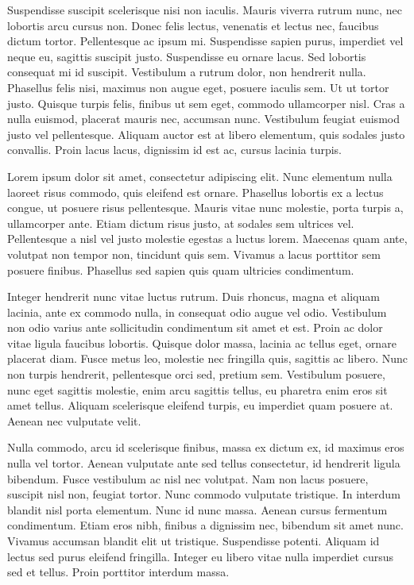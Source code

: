 \documentclass[twoside,openright,a4paper,11pt,french]{article}
\begin{document}
Suspendisse suscipit scelerisque nisi non iaculis. Mauris viverra rutrum nunc, nec lobortis arcu cursus non. Donec felis lectus, venenatis et lectus nec, faucibus dictum tortor. Pellentesque ac ipsum mi. Suspendisse sapien purus, imperdiet vel neque eu, sagittis suscipit justo. Suspendisse eu ornare lacus. Sed lobortis consequat mi id suscipit. Vestibulum a rutrum dolor, non hendrerit nulla. Phasellus felis nisi, maximus non augue eget, posuere iaculis sem. Ut ut tortor justo. Quisque turpis felis, finibus ut sem eget, commodo ullamcorper nisl. Cras a nulla euismod, placerat mauris nec, accumsan nunc. Vestibulum feugiat euismod justo vel pellentesque. Aliquam auctor est at libero elementum, quis sodales justo convallis. Proin lacus lacus, dignissim id est ac, cursus lacinia turpis.

Lorem ipsum dolor sit amet, consectetur adipiscing elit. Nunc elementum nulla laoreet risus commodo, quis eleifend est ornare. Phasellus lobortis ex a lectus congue, ut posuere risus pellentesque. Mauris vitae nunc molestie, porta turpis a, ullamcorper ante. Etiam dictum risus justo, at sodales sem ultrices vel. Pellentesque a nisl vel justo molestie egestas a luctus lorem. Maecenas quam ante, volutpat non tempor non, tincidunt quis sem. Vivamus a lacus porttitor sem posuere finibus. Phasellus sed sapien quis quam ultricies condimentum.

Integer hendrerit nunc vitae luctus rutrum. Duis rhoncus, magna et aliquam lacinia, ante ex commodo nulla, in consequat odio augue vel odio. Vestibulum non odio varius ante sollicitudin condimentum sit amet et est. Proin ac dolor vitae ligula faucibus lobortis. Quisque dolor massa, lacinia ac tellus eget, ornare placerat diam. Fusce metus leo, molestie nec fringilla quis, sagittis ac libero. Nunc non turpis hendrerit, pellentesque orci sed, pretium sem. Vestibulum posuere, nunc eget sagittis molestie, enim arcu sagittis tellus, eu pharetra enim eros sit amet tellus. Aliquam scelerisque eleifend turpis, eu imperdiet quam posuere at. Aenean nec vulputate velit.

Nulla commodo, arcu id scelerisque finibus, massa ex dictum ex, id maximus eros nulla vel tortor. Aenean vulputate ante sed tellus consectetur, id hendrerit ligula bibendum. Fusce vestibulum ac nisl nec volutpat. Nam non lacus posuere, suscipit nisl non, feugiat tortor. Nunc commodo vulputate tristique. In interdum blandit nisl porta elementum. Nunc id nunc massa. Aenean cursus fermentum condimentum. Etiam eros nibh, finibus a dignissim nec, bibendum sit amet nunc. Vivamus accumsan blandit elit ut tristique. Suspendisse potenti. Aliquam id lectus sed purus eleifend fringilla. Integer eu libero vitae nulla imperdiet cursus sed et tellus. Proin porttitor interdum massa.
\end{document}
